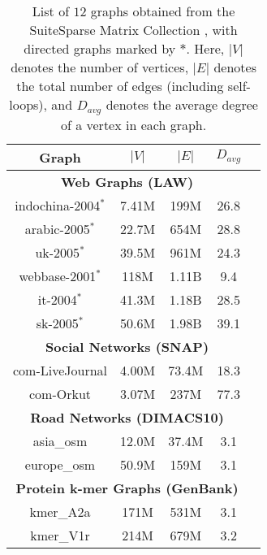 \begin{table}[hbtp]
  \centering
  \caption{List of $12$ graphs obtained from the SuiteSparse Matrix Collection \cite{suite19}, with directed graphs marked by $*$. Here, $|V|$ denotes the number of vertices, $|E|$ denotes the total number of edges (including self-loops), and $D_{avg}$ denotes the average degree of a vertex in each graph.}
  \label{tab:dataset-large}
  \begin{tabular}{|c||c|c|c|c|}
    \toprule
    \textbf{Graph} &
    \textbf{\textbf{$|V|$}} &
    \textbf{\textbf{$|E|$}} &
    \textbf{\textbf{$D_{avg}$}} \\
    \midrule
    \multicolumn{4}{|c|}{\textbf{Web Graphs (LAW)}} \\ \hline
    indochina-2004$^*$ & 7.41M & 199M & 26.8 \\ \hline  %
    arabic-2005$^*$ & 22.7M & 654M & 28.8 \\ \hline  %
    uk-2005$^*$ & 39.5M & 961M & 24.3 \\ \hline  %
    webbase-2001$^*$ & 118M & 1.11B & 9.4 \\ \hline  %
    it-2004$^*$ & 41.3M & 1.18B & 28.5 \\ \hline  %
    sk-2005$^*$ & 50.6M & 1.98B & 39.1 \\ \hline  %
    \multicolumn{4}{|c|}{\textbf{Social Networks (SNAP)}} \\ \hline
    com-LiveJournal & 4.00M & 73.4M & 18.3 \\ \hline  %
    com-Orkut & 3.07M & 237M & 77.3 \\ \hline  %
    \multicolumn{4}{|c|}{\textbf{Road Networks (DIMACS10)}} \\ \hline
    asia\_osm & 12.0M & 37.4M & 3.1 \\ \hline  %
    europe\_osm & 50.9M & 159M & 3.1 \\ \hline  %
    \multicolumn{4}{|c|}{\textbf{Protein k-mer Graphs (GenBank)}} \\ \hline
    kmer\_A2a & 171M & 531M & 3.1 \\ \hline  %
    kmer\_V1r & 214M & 679M & 3.2 \\ \hline  %
  \bottomrule
  \end{tabular}
\end{table}
